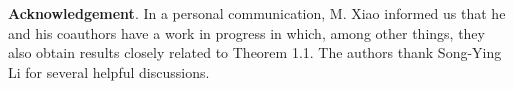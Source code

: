 \documentclass[a4paper,centertags,osxzneside,12pt]{amsart}
\numberwithin{equation}{section}
\begin{document}
{\bf Acknowledgement}. In a personal communication, M. Xiao informed us that he and his coauthors 
have a work in progress in which, among other things, they also obtain results closely related to Theorem 1.1. The  authors thank  Song-Ying Li for several  helpful discussions.
\end{document}
